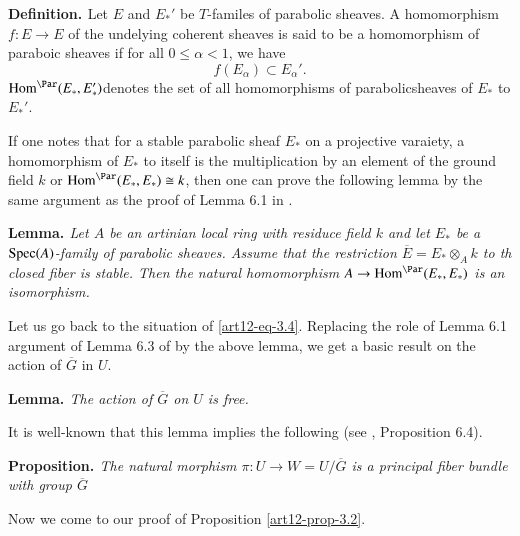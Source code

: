 \medskip
\noindent
{\bfseries {} Definition. \label{art12-definition-3.6}}  Let $E$ and $E_{*}'$ be $T$-familes of parabolic sheaves. A homomorphism $f: E \rightarrow E$ of the undelying coherent sheaves is said to be a homomorphism of paraboic sheaves if for all $0 \leq \alpha < 1$, we have
$$
f(E_{\alpha}) \subset E_{\alpha}'.
$$
$\Hom^{\Par}(E_{*}, E_{*}')$\pageoriginale denotes the set of all homomorphisms of parabolic\break sheaves of $E_{*}$ to $E_{*}'$.

If one notes that for a stable parabolic sheaf $E_{*}$ on a projective varaiety, a homomorphism of $E_{*}$ to itself is the multiplication by an element of the ground field $k$ or $\Hom^{\Par}(E_{*}, E_{*}) \cong k$, then one can prove the following lemma by the same argument as the proof of Lemma 6.1 in \cite{art12-key5}.

\medskip
\noindent
{\bfseries {} Lemma. \label{art12-Lemma-3.7}} \textit{Let $A$ be an artinian local ring with residuce field $k$ and let $E_{*}$ be a $\operatorname{Spec}(A)$-family of parabolic sheaves. Assume that the restriction $\overline{E}=E_{*}\otimes_{A} k$ to th closed fiber is stable. Then the natural homomorphism $A\rightarrow \Hom^{\Par}(E_{*}, E_{*})$ is an isomorphism.}

 Let us  go back to the situation of \eqref{art12-eq-3.4}. Replacing the role of Lemma 6.1 argument of Lemma 6.3 of
 \cite{art12-key5} by the above lemma, we get a basic result on the action of $\overline{G}$ in $U$.

\medskip
\noindent
{\bfseries {} Lemma. \label{art12-Lemma-3.8}}\textit{The action of $\overline{G}$ on $U$ is free.}

 It is well-known that this lemma implies the following (see \cite{art12-key5}, Proposition 6.4).

\medskip
\noindent
{\bfseries {} Proposition. \label{art12-prop-3.9}}\textit{The natural morphism
$\pi : U \rightarrow W = U/\overline{G}$ is a principal fiber bundle with group $\overline{G}$}

Now we come to our proof of Proposition \ref{art12-prop-3.2}.

